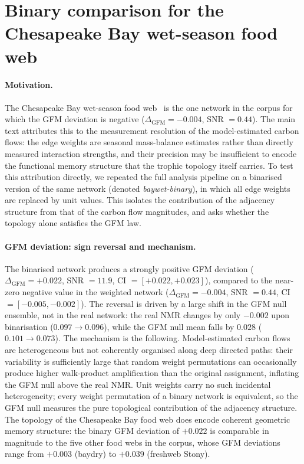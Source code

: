 \documentclass[aps,superscriptaddress,11pt]{revtex4-2}
\theoremstyle{definition}
\theoremstyle{plain}
\begin{document}
\section{Binary comparison for the Chesapeake Bay wet-season food web}
\label{sec:baywet_binary}

\paragraph{Motivation.}
The Chesapeake Bay wet-season food web~\cite{Baird1989} is the one network
in the corpus for which the GFM deviation is negative
($\Delta_{\mathrm{GFM}} = -0.004$, SNR $= 0.44$).  The main text
attributes this to the measurement resolution of the model-estimated
carbon flows: the edge weights are seasonal mass-balance estimates rather
than directly measured interaction strengths, and their precision may be
insufficient to encode the functional memory structure that the trophic
topology itself carries.  To test this attribution directly, we repeated
the full analysis pipeline on a binarised version of the same network
(denoted \textit{baywet-binary}), in which all edge weights are replaced
by unit values.  This isolates the contribution of the adjacency structure
from that of the carbon flow magnitudes, and asks whether the topology
alone satisfies the GFM law.

\paragraph{GFM deviation: sign reversal and mechanism.}
The binarised network produces a strongly positive GFM deviation
($\Delta_{\mathrm{GFM}} = +0.022$, SNR $= 11.9$,
CI $= [+0.022, +0.023]$), compared to the near-zero negative value in the
weighted network ($\Delta_{\mathrm{GFM}} = -0.004$, SNR $= 0.44$,
CI $= [-0.005, -0.002]$).  The reversal is driven by a large shift in the
GFM null ensemble, not in the real network: the real NMR changes by only
$-0.002$ upon binarisation ($0.097 \to 0.096$), while the GFM null mean
falls by $0.028$ ($0.101 \to 0.073$).  The mechanism is the following.
Model-estimated carbon flows are heterogeneous but not coherently organised
along deep directed paths: their variability is sufficiently large that
random weight permutations can occasionally produce higher walk-product
amplification than the original assignment, inflating the GFM null above
the real NMR.  Unit weights carry no such incidental heterogeneity; every
weight permutation of a binary network is equivalent, so the GFM null
measures the pure topological contribution of the adjacency structure.
The topology of the Chesapeake Bay food web does encode coherent geometric
memory structure: the binary GFM deviation of $+0.022$ is comparable in
magnitude to the five other food webs in the corpus, whose GFM deviations
range from $+0.003$ (baydry) to $+0.039$ (freshweb Stony).
\end{document}
